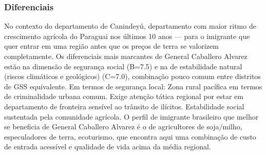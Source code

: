 \subsubsection*{Diferenciais}\label{dif-general-caballero-alvarez-1411}
No contexto do departamento de Canindeyú, departamento com maior ritmo de crescimento agrícola do Paraguai nos últimos 10 anos — para o imigrante que quer entrar em uma região antes que os preços de terra se valorizem completamente. Os diferenciais mais marcantes de General Caballero Alvarez estão na dimensão de segurança social (B=7.5) e na de estabilidade natural (riscos climáticos e geológicos) (C=7.0), combinação pouco comum entre distritos de GSS equivalente. Em termos de segurança local: Zona rural pacífica em termos de criminalidade urbana comum. Exige atenção tática regional por estar em departamento de fronteira sensível ao trânsito de ilícitos. Estabilidade social sustentada pela comunidade agrícola. O perfil de imigrante brasileiro que melhor se beneficia de General Caballero Alvarez é o de agricultores de soja/milho, especuladores de terra, ecoturismo, que encontra aqui uma combinação de custo de entrada acessível e qualidade de vida acima da média regional.
